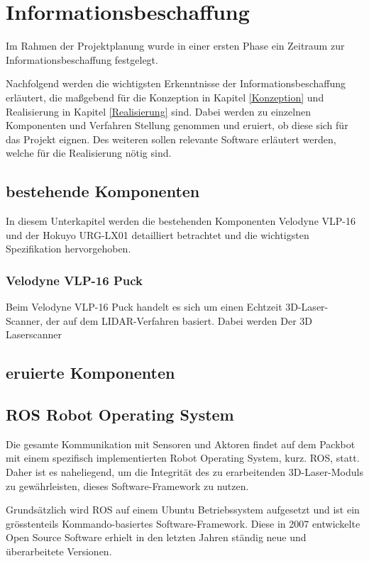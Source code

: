 \chapter{Informationsbeschaffung}

Im Rahmen der Projektplanung wurde in einer ersten Phase ein Zeitraum zur Informationsbeschaffung festgelegt.

Nachfolgend werden die wichtigsten Erkenntnisse der Informationsbeschaffung erläutert, die maßgebend für die Konzeption in Kapitel \ref{Konzeption} und Realisierung in Kapitel \ref{Realisierung} sind. Dabei werden zu einzelnen Komponenten und Verfahren Stellung genommen und eruiert, ob diese sich für das Projekt eignen. Des weiteren sollen relevante Software erläutert werden, welche für die Realisierung nötig sind.


\section{bestehende Komponenten}
\label{bestehende_Sensoren}
In diesem Unterkapitel werden die bestehenden Komponenten Velodyne VLP-16 und der Hokuyo URG-LX01 detailliert betrachtet und die wichtigsten Spezifikation hervorgehoben.  

\subsection{Velodyne VLP-16 Puck}

Beim Velodyne VLP-16 Puck handelt es sich um einen Echtzeit 3D-Laser-Scanner, der auf dem LIDAR-Verfahren basiert. Dabei werden Der 3D Laserscanner 


\section{eruierte Komponenten}
\label{eruierte_Komponenten}


\section{ROS Robot Operating System}
Die gesamte Kommunikation mit Sensoren und Aktoren findet auf dem Packbot mit einem spezifisch implementierten Robot Operating System, kurz. ROS, statt. Daher ist es naheliegend, um die Integrität des zu erarbeitenden 3D-Laser-Moduls zu gewährleisten, dieses Software-Framework zu nutzen.  

Grundsätzlich wird ROS auf einem Ubuntu Betriebssystem aufgesetzt und ist ein grösstenteils Kommando-basiertes Software-Framework. Diese in 2007 entwickelte Open Source Software erhielt in den letzten Jahren ständig neue und überarbeitete Versionen.  


